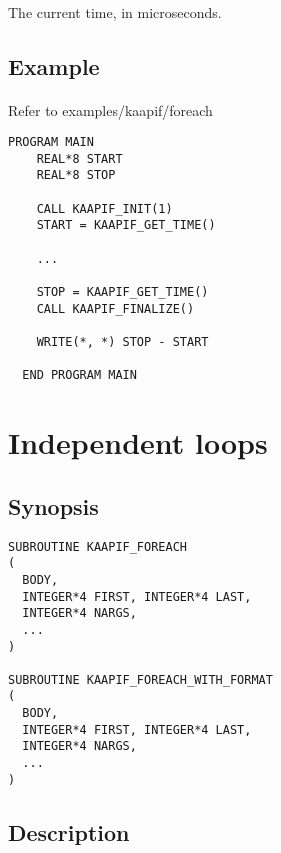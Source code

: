 \documentclass[a4paper, 11pt]{article}
\begin{document}
\paragraph{}
The current time, in microseconds.

\subsection{Example}
\paragraph{}
Refer to examples/kaapif/foreach\\

\begin{small}
\begin{lstlisting}[frame=tb]
  PROGRAM MAIN
    REAL*8 START
    REAL*8 STOP

    CALL KAAPIF_INIT(1)
    START = KAAPIF_GET_TIME()

    ...

    STOP = KAAPIF_GET_TIME()
    CALL KAAPIF_FINALIZE()

    WRITE(*, *) STOP - START

  END PROGRAM MAIN
\end{lstlisting}
\end{small}


\newpage
\section{Independent loops}

\subsection{Synopsis}
\begin{small}
\lstset{language=C}
\begin{lstlisting}[frame=tb]
SUBROUTINE KAAPIF_FOREACH
(
  BODY,
  INTEGER*4 FIRST, INTEGER*4 LAST,
  INTEGER*4 NARGS,
  ...
)

SUBROUTINE KAAPIF_FOREACH_WITH_FORMAT
(
  BODY,
  INTEGER*4 FIRST, INTEGER*4 LAST,
  INTEGER*4 NARGS,
  ...
)
\end{lstlisting}
\end{small}

\subsection{Description}
\end{document}
